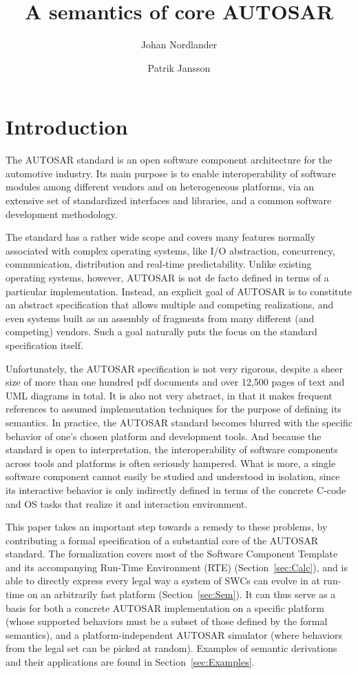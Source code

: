 \documentclass[twocolumn]{article}
\title{A semantics of core AUTOSAR}
\author{Johan Nordlander \and Patrik Jansson}
\begin{document}
\maketitle
\begin{abstract}

\end{abstract}

\section{Introduction}
\label{sec:Intro}

The AUTOSAR standard is an open software component architecture for the automotive industry. Its main purpose is to enable interoperability of software modules among different vendors and on heterogeneous platforms, via an extensive set of standardized interfaces and libraries, and a common software development methodology.

The standard has a rather wide scope and covers many features normally associated with complex operating systems, like I/O abstraction, concurrency, communication, distribution and real-time predictability. Unlike existing operating systems, however, AUTOSAR is not de facto defined in terms of a particular implementation. Instead, an explicit goal of AUTOSAR is to constitute an abstract specification that allows multiple and competing realizations, and even systems built as an assembly of fragments from many different (and competing) vendors. Such a goal naturally puts the focus on the standard specification itself. 

Unfortunately, the AUTOSAR specification is not very rigorous, despite a sheer size of more than one hundred pdf documents and over 12,500 pages of text and UML diagrams in total. It is also not very abstract, in that it makes frequent references to assumed implementation techniques for the purpose of defining its semantics. In practice, the AUTOSAR standard becomes blurred with the specific behavior of one's chosen platform and development tools. And because the standard is open to interpretation, the interoperability of software components across tools and platforms is often seriously hampered. What is more, a single software component cannot easily be studied and understood in isolation, since its interactive behavior is only indirectly defined in terms of the concrete C-code and OS tasks that realize it and interaction environment.

This paper takes an important step towards a remedy to these problems, by contributing a formal specification of a substantial core of the AUTOSAR standard. The formalization covers most of the Software Component Template and its accompanying Run-Time Environment (RTE) (Section~\ref{sec:Calc}), and is able to directly express every legal way a system of SWCs can evolve in at run-time on an arbitrarily fast platform (Section~\ref{sec:Sem}). It can thus serve as a basis for both a concrete AUTOSAR implementation on a specific platform (whose supported behaviors must be a subset of those defined by the formal semantics), and a platform-independent AUTOSAR simulator (where behaviors from the legal set can be picked at random). Examples of semantic derivations and their applications are found in Section~\ref{sec:Examples}.
\end{document}
